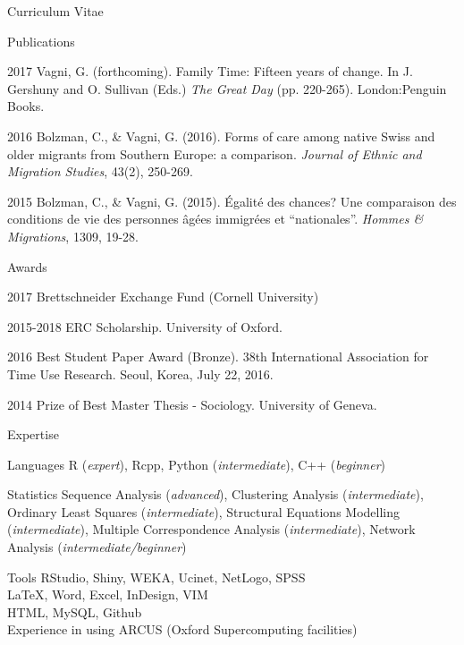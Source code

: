 \documentclass[12pt,a4paper]{article}
\newcommand*{\ac}[1]{\mbox{#1}}
\begin{document}
\begin{cv}{Curriculum Vitae}
 
 \newpage
 
   \begin{cvlist}{Publications}
	
   	 \item [2017] Vagni, G. (forthcoming). Family Time: Fifteen years of change. In J. Gershuny and O. Sullivan (Eds.) \emph{The Great Day} (pp. 220-265). London:Penguin Books.  
  
   	\item [2016] Bolzman, C., \& Vagni, G. (2016). Forms of care among native Swiss and older migrants from Southern Europe: a comparison. \emph{Journal of Ethnic and Migration Studies}, 43(2), 250-269.
   	
   	\item [2015]
   	Bolzman, C., \& Vagni, G. (2015). {\'E}galit{\'e} des chances? Une
   	comparaison des conditions de vie des personnes {\^a}g{\'e}es immigr{\'e}es
   	et ``nationales''. \emph{Hommes \& Migrations}, 1309, 19-28.
   \end{cvlist}
 
 
    \begin{cvlist}{Awards}
    	\item[2017]  Brettschneider Exchange Fund (Cornell University)
    	\item [2015-2018] ERC Scholarship. University of Oxford. 
    	\item [2016]  Best Student Paper Award (Bronze). 38th International Association for Time Use Research. Seoul, Korea, July 22, 2016. 
    	\item [2014] Prize of Best Master Thesis - Sociology.  University of Geneva. 
    \end{cvlist}

  \begin{cvlist}{\ac{Expertise}}
  \item[Languages] R (\emph{expert}), Rcpp, Python (\emph{intermediate}),  C++ (\emph{beginner}) 
  
  \item[Statistics] Sequence Analysis (\emph{advanced}), 
  Clustering Analysis (\emph{intermediate}), 
  Ordinary Least Squares (\emph{intermediate}), Structural Equations Modelling (\emph{intermediate}), Multiple Correspondence Analysis (\emph{intermediate}), 
  Network Analysis (\emph{intermediate/beginner})
  
  \item[Tools] RStudio, Shiny, \ac{WEKA}, Ucinet, NetLogo, \ac{SPSS} \\ \LaTeX, Word, Excel, InDesign, \ac{VIM} \\ 
 \ac{HTML},  MySQL,  Github \\ 
 Experience in using ARCUS (Oxford Supercomputing facilities)
  \end{cvlist}


\end{cv}
\end{document}
